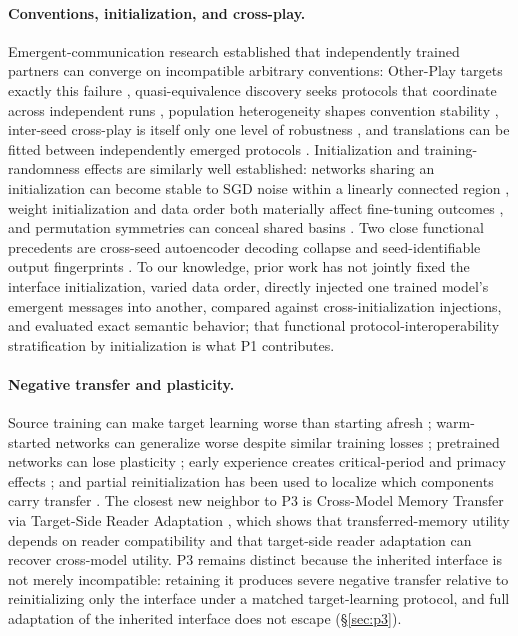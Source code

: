 \documentclass[11pt]{article}
\begin{document}
\paragraph{Conventions, initialization, and cross-play.}
Emergent-communication research established that independently trained partners can converge on incompatible arbitrary conventions: Other-Play targets exactly this failure \citep{hu2020otherplay}, quasi-equivalence discovery seeks protocols that coordinate across independent runs \citep{bullard2021qed}, population heterogeneity shapes convention stability \citep{rita2022population}, inter-seed cross-play is itself only one level of robustness \citep{wolski2026crossplay}, and translations can be fitted between independently emerged protocols \citep{levy2025translation}. Initialization and training-randomness effects are similarly well established: networks sharing an initialization can become stable to SGD noise within a linearly connected region \citep{frankle2019lmc}, weight initialization and data order both materially affect fine-tuning outcomes \citep{dodge2020finetuning}, and permutation symmetries can conceal shared basins \citep{ainsworth2022rebasin}. Two close functional precedents are cross-seed autoencoder decoding collapse \citep{okatan2025keys} and seed-identifiable output fingerprints \citep{suzuki2025fingerprints}. To our knowledge, prior work has not jointly fixed the interface initialization, varied data order, directly injected one trained model's emergent messages into another, compared against cross-initialization injections, and evaluated exact semantic behavior; that functional protocol-interoperability stratification by initialization is what P1 contributes.

\paragraph{Negative transfer and plasticity.}
Source training can make target learning worse than starting afresh \citep{wang2018negative}; warm-started networks can generalize worse despite similar training losses \citep{ash2019warm}; pretrained networks can lose plasticity \citep{berariu2021plasticity,dohare2023plasticity}; early experience creates critical-period and primacy effects \citep{achille2017critical,nikishin2022primacy}; and partial reinitialization has been used to localize which components carry transfer \citep{tamkin2020transferability}. The closest new neighbor to P3 is Cross-Model Memory Transfer via Target-Side Reader Adaptation \citep{li2026memory}, which shows that transferred-memory utility depends on reader compatibility and that target-side reader adaptation can recover cross-model utility. P3 remains distinct because the inherited interface is not merely incompatible: retaining it produces severe negative transfer relative to reinitializing only the interface under a matched target-learning protocol, and full adaptation of the inherited interface does not escape (\S\ref{sec:p3}).
\end{document}
